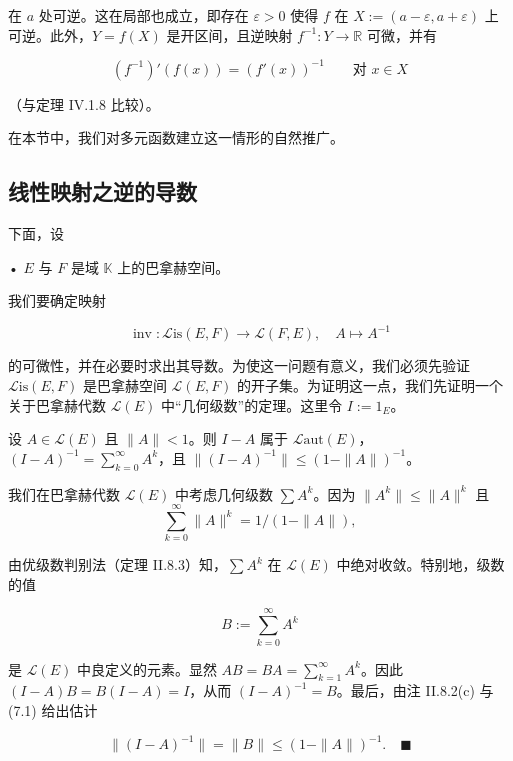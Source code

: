 在 $ a $ 处可逆。这在局部也成立，即存在 $ \varepsilon > 0 $ 使得 $ f $ 在 $ X := (a - \varepsilon, a + \varepsilon) $ 上可逆。此外，$ Y = f(X) $ 是开区间，且逆映射 $ f^{-1} : Y \to \mathbb{R} $ 可微，并有

\[
(f^{-1})'(f(x)) = (f'(x))^{-1} \qquad \text{对 } x \in X
\]

（与定理 IV.1.8 比较）。

在本节中，我们对多元函数建立这一情形的自然推广。

\subsection*{线性映射之逆的导数}

下面，设

• $ E $ 与 $ F $ 是域 $ \mathbb{K} $ 上的巴拿赫空间。

我们要确定映射

\[
\operatorname{inv} : \mathcal{L}\mathrm{is}(E, F) \to \mathcal{L}(F, E) , \quad A \mapsto A^{-1}
\]

的可微性，并在必要时求出其导数。为使这一问题有意义，我们必须先验证 $ \mathcal{L}\mathrm{is}(E, F) $ 是巴拿赫空间 $ \mathcal{L}(E, F) $ 的开子集。为证明这一点，我们先证明一个关于巴拿赫代数 $ \mathcal{L}(E) $ 中“几何级数”的定理。这里令 $ I := 1_{E} $。

\begin{proposition}

设 $ A \in \mathcal{L}(E) $ 且 $ \|A\| < 1 $。则 $ I - A $ 属于 $ \mathcal{L}\mathrm{aut}(E) $，$ (I - A)^{-1} = \sum_{k=0}^{\infty} A^{k} $，且 $ \|(I - A)^{-1}\| \le (1 - \|A\|)^{-1} $。

\proofhead
我们在巴拿赫代数 $ \mathcal{L}(E) $ 中考虑几何级数 $ \sum A^{k} $。因为 $ \|A^{k}\| \le \|A\|^{k} $ 且
\begin{equation}
\sum_{k=0}^{\infty} \|A\|^{k} = 1/(1 - \|A\|) ,\tag{7.1}
\end{equation}

由优级数判别法（定理 II.8.3）知，$ \sum A^{k} $ 在 $ \mathcal{L}(E) $ 中绝对收敛。特别地，级数的值

\[
B := \sum_{k=0}^{\infty} A^{k}
\]

是 $ \mathcal{L}(E) $ 中良定义的元素。显然 $ AB = BA = \sum_{k=1}^{\infty} A^{k} $。因此 $ (I - A)B = B(I - A) = I $，从而 $ (I - A)^{-1} = B $。最后，由注 II.8.2(c) 与 (7.1) 给出估计

\[
\|(I - A)^{-1}\| = \|B\| \le (1 - \|A\|)^{-1} .\quad\blacksquare
\]
\end{proposition}


